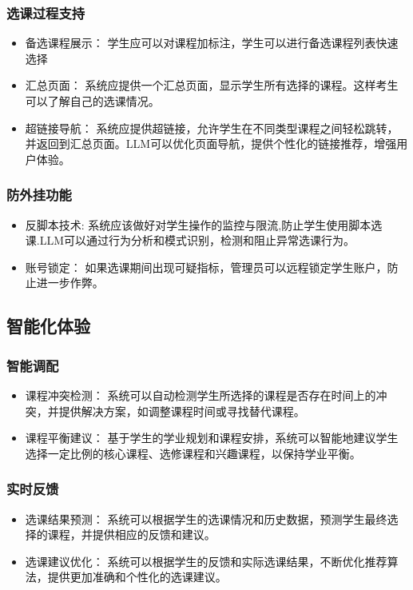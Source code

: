 \documentclass{article}
\begin{document}
\subsubsection{选课过程支持}
\begin{itemize}
  \item 备选课程展示： 学生应可以对课程加标注，学生可以进行备选课程列表快速选择
  \item 汇总页面： 系统应提供一个汇总页面，显示学生所有选择的课程。这样考生可以了解自己的选课情况。
  \item 超链接导航： 系统应提供超链接，允许学生在不同类型课程之间轻松跳转，并返回到汇总页面。LLM可以优化页面导航，提供个性化的链接推荐，增强用户体验。
\end{itemize}

\subsubsection{防外挂功能}
\begin{itemize}
  \item 反脚本技术: 系统应该做好对学生操作的监控与限流,防止学生使用脚本选课.LLM可以通过行为分析和模式识别，检测和阻止异常选课行为。
  \item 账号锁定： 如果选课期间出现可疑指标，管理员可以远程锁定学生账户，防止进一步作弊。
\end{itemize}

\subsection{智能化体验}
\subsubsection{智能调配}
\begin{itemize}
  \item 课程冲突检测： 系统可以自动检测学生所选择的课程是否存在时间上的冲突，并提供解决方案，如调整课程时间或寻找替代课程。
  \item 课程平衡建议： 基于学生的学业规划和课程安排，系统可以智能地建议学生选择一定比例的核心课程、选修课程和兴趣课程，以保持学业平衡。
\end{itemize}

\subsubsection{实时反馈}
\begin{itemize}
  \item 选课结果预测： 系统可以根据学生的选课情况和历史数据，预测学生最终选择的课程，并提供相应的反馈和建议。
  \item 选课建议优化： 系统可以根据学生的反馈和实际选课结果，不断优化推荐算法，提供更加准确和个性化的选课建议。
\end{itemize}
\end{document}
